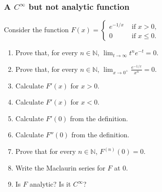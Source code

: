 \documentclass[14pt]{beamer}
\begin{document}
\begin{frame}[t]
	\fontsize{13}{13}\selectfont
	\frametitle{A $\displaystyle C^{\infty}$ but not analytic function}

	Consider the function $\displaystyle F(x) =
	\begin{cases}
		e^{-1/x} & \text{ if }x >0,     \\
		0        & \text{ if }x \leq 0.
	\end{cases}$

	\begin{enumerate}
		\item Prove that, for every $n \in \mathbb{N}$, $\displaystyle \lim_{t \to
			\infty}t^{n}e^{-t}=0$.

		\item Prove that, for every $n \in \mathbb{N}$, $\displaystyle \lim_{x \to
			0^+}\frac{e^{-1/x}}{x^{n}}=0$.

		\item Calculate $\displaystyle F'(x)$ for $x>0$.

		\item Calculate $\displaystyle F'(x)$ for $x <0$.

		\item Calculate $\displaystyle F'(0)$ from the definition.

		\item Calculate $\displaystyle F''(0)$ from the definition.

		\item Prove that for every $n \in \mathbb{N}$,
			$\displaystyle F^{(n)}(0) = 0$.

		\item Write the Maclaurin series for $F$ at $0$.

		\item Is $F$ analytic? Is it $C^{\infty}$?
	\end{enumerate}
\end{frame}
\end{document}
